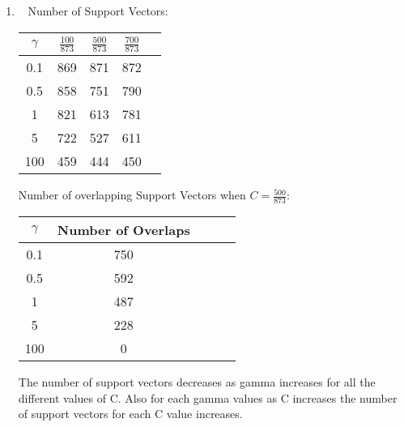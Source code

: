 \documentclass[12pt, fullpage,letterpaper]{article}
\begin{document}
\begin{enumerate}
\begin{enumerate}
	\item~
	\newline Number of Support Vectors:
	\newline
		\begin{table}[h]
	\centering
	\begin{tabular}{c|c|c|c|c}
		$\gamma$ & $\frac{100}{873}$ & $\frac{500}{873}$ & $\frac{700}{873}$\\ 
		\hline\hline
		0.1 & 869 & 871 & 872 \\ \hline
		0.5 & 858 & 751 & 790  \\ \hline
		1 & 821 & 613 & 781  \\ \hline
		5 & 722 & 527 & 611  \\ \hline
		100 & 459 & 444 & 450  \\ \hline
	\end{tabular}
\end{table}
\newline Number of overlapping Support Vectors when $C=\frac{500}{873}$:
	\newline
		\begin{table}[h]
	\centering
	\begin{tabular}{c|c|c|c|c}
		$\gamma$ & Number of Overlaps \\ 
		\hline\hline
		0.1 & 750 \\ \hline
		0.5 & 592  \\ \hline
		1 & 487   \\ \hline
		5 & 228  \\ \hline
		100 & 0 \\ \hline
	\end{tabular}
\end{table}
\newline The number of support vectors decreases as gamma increases for all the different values of C. Also for each gamma values as C increases the number of support vectors for each C value increases. 	
	
\end{enumerate} 

\end{enumerate}
\end{document}
